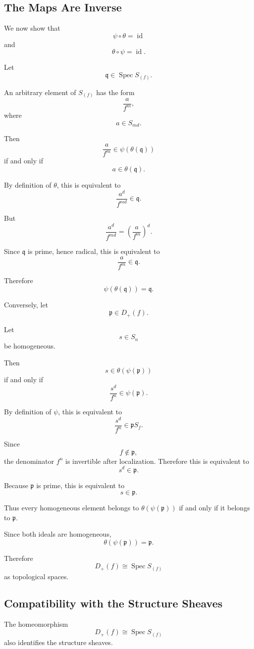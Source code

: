 \documentclass[12pt,a4paper]{article}
\DeclareMathOperator{\Spec}{Spec}
\theoremstyle{notespace}
\begin{document}
\subsection{The Maps Are Inverse}

We now show that
\[
\psi\circ\theta=\operatorname{id}
\]
and
\[
\theta\circ\psi=\operatorname{id}.
\]

Let
\[
\mathfrak q\in\Spec S_{(f)}.
\]

An arbitrary element of \(S_{(f)}\) has the form
\[
\frac{a}{f^m},
\]
where
\[
a\in S_{md}.
\]

Then
\[
\frac{a}{f^m}\in \psi(\theta(\mathfrak q))
\]
if and only if
\[
a\in\theta(\mathfrak q).
\]

By definition of \(\theta\), this is equivalent to
\[
\frac{a^d}{f^{md}}\in\mathfrak q.
\]

But
\[
\frac{a^d}{f^{md}}
=
\left(\frac{a}{f^m}\right)^d.
\]

Since \(\mathfrak q\) is prime, hence radical, this is equivalent to
\[
\frac{a}{f^m}\in\mathfrak q.
\]

Therefore
\[
\psi(\theta(\mathfrak q))=\mathfrak q.
\]

Conversely, let
\[
\mathfrak p\in D_+(f).
\]

Let
\[
s\in S_n
\]
be homogeneous.

Then
\[
s\in\theta(\psi(\mathfrak p))
\]
if and only if
\[
\frac{s^d}{f^n}\in\psi(\mathfrak p).
\]

By definition of \(\psi\), this is equivalent to
\[
\frac{s^d}{f^n}\in\mathfrak pS_f.
\]

Since
\[
f\notin\mathfrak p,
\]
the denominator \(f^n\) is invertible after localization. Therefore this is equivalent to
\[
s^d\in\mathfrak p.
\]

Because \(\mathfrak p\) is prime, this is equivalent to
\[
s\in\mathfrak p.
\]

Thus every homogeneous element belongs to \(\theta(\psi(\mathfrak p))\) if and only if it
belongs to \(\mathfrak p\).

Since both ideals are homogeneous,
\[
\theta(\psi(\mathfrak p))=\mathfrak p.
\]

Therefore
\[
D_+(f)\cong\Spec S_{(f)}
\]
as topological spaces.

\subsection{Compatibility with the Structure Sheaves}

The homeomorphism
\[
D_+(f)\cong\Spec S_{(f)}
\]
also identifies the structure sheaves.
\end{document}
